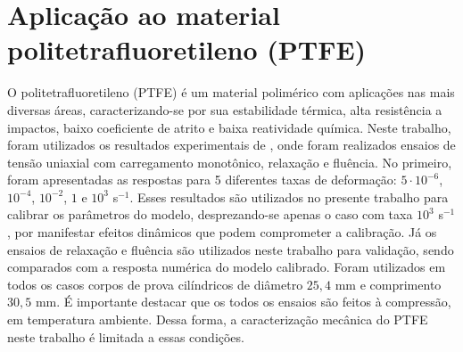 \documentclass[Tese.tex]{subfiles}
\begin{document}
{\section{Aplicação ao material politetrafluoretileno (PTFE)}\label{sec:validacao}

O politetrafluoretileno (PTFE) é um material polimérico com aplicações nas mais diversas áreas, caracterizando-se por sua estabilidade térmica, alta resistência a impactos, baixo coeficiente de atrito e baixa reatividade química. Neste trabalho, foram utilizados os resultados experimentais de , onde foram realizados ensaios de tensão uniaxial com carregamento monotônico, relaxação e fluência. No primeiro, foram apresentadas as respostas para 5 diferentes taxas de deformação: $5\cdot 10^{-6}$, $10^{-4}$, $10^{-2}$, $1$ e $10^3$ s$^{-1}$. Esses resultados são utilizados no presente trabalho para calibrar os parâmetros do modelo, desprezando-se apenas o caso com taxa $10^3$ s$^{-1}$, por manifestar efeitos dinâmicos que podem comprometer a calibração. Já os ensaios de relaxação e fluência são utilizados neste trabalho para validação, sendo comparados com a resposta numérica do modelo calibrado. Foram utilizados em todos os casos corpos de prova cilíndricos de diâmetro $25,4$ mm e comprimento $30,5$ mm. É importante destacar que os todos os ensaios são feitos à compressão, em temperatura ambiente. Dessa forma, a caracterização mecânica do PTFE neste trabalho é limitada a essas condições.

}
\end{document}
